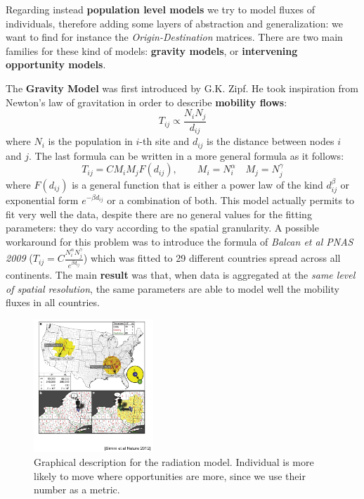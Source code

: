 \documentclass[../main/main.tex]{subfiles}
\begin{document}
Regarding instead \textbf{population level models} we try to model fluxes of individuals, therefore adding some layers of abstraction and generalization: we want to find for instance the \textit{Origin-Destination} matrices. There are two main families for these kind of models: \textbf{gravity models}, or \textbf{intervening opportunity models}.

The \textbf{Gravity Model} was first introduced by G.K. Zipf. He took inspiration from Newton's law of gravitation in order to describe \textbf{mobility flows}:
\begin{equation}
    T_{ij} \propto \frac{N_i N_j}{d_{ij}}
\end{equation}
where $N_i$ is the population in $i$-th site and $d_{ij}$ is the distance between nodes $i$ and $j$. The last formula can be written in a more general formula as it follows:
\begin{equation}
    T_{ij} = C M_i M_j F(d_{ij}), \qquad M_i = N_i^\alpha \quad M_j = N_j^\gamma
\end{equation}
where $F(d_{ij})$ is a general function that is either a power law of the kind $d_{ij}^\beta$ or exponential form $e^{-\beta d_{ij}}$ or a combination of both.
This model actually permits to fit very well the data, despite there are no general values for the fitting parameters: they do vary according to the spatial granularity. A possible workaround for this problem was to introduce the formula of \textit{Balcan et al PNAS 2009} ($T_{ij} = C \frac{N_i^\alpha N_j^\gamma}{e^{\beta d_{ij}}}$) which was fitted to 29 different countries spread across all continents.
The main \textbf{result} was that, when data is aggregated at the \textit{same level of spatial resolution}, the same parameters are able to model well the mobility fluxes in all countries.

\begin{figure}[h!]
\centering
\includegraphics[width=0.4\textwidth]{../lessons/image/14/image04.png}
\caption{\label{fig:13_04} Graphical description for the radiation model. Individual is more likely to move where opportunities are more, since we use their number as a metric.}
\end{figure}
\end{document}
